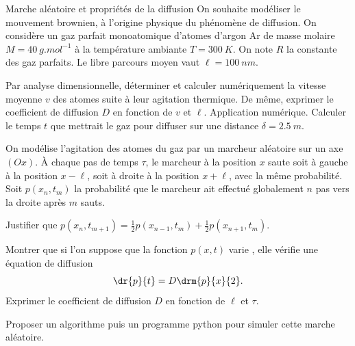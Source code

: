 \begin{exo}[PC][1][colle]{Marche aléatoire et propriétés de la diffusion}%
On souhaite modéliser le mouvement brownien, à l'origine physique du phénomène de diffusion. On considère un gaz parfait monoatomique d'atomes d'argon Ar de masse molaire $M = \SI{40}{g.mol^{-1}}$ à la température ambiante $T=\SI{300}{K}$.  On note $R$ la constante des gaz parfaits. Le libre parcours moyen vaut $\ell = \SI{100}{nm}$.
 \begin{quest}
  \item
  Par analyse dimensionnelle, déterminer et calculer numériquement la vitesse moyenne $v$ des atomes suite à leur agitation thermique. De même, exprimer le coefficient de diffusion $D$ en fonction de $v$ et $\ell$. Application numérique.
  Calculer le temps $t$ que mettrait le gaz pour diffuser sur une distance $\delta = \SI{2.5}{m}$.
\end{quest}
On modélise l'agitation des atomes du gaz par un marcheur aléatoire sur un axe $(Ox)$. À chaque pas de temps $\tau$, le marcheur à la position $x$ saute soit à gauche à la position $x-\ell$, soit à droite à la position $x+\ell$, avec la même probabilité.
Soit $p(x_n,t_m)$ la probabilité que le marcheur ait effectué globalement $n$ pas vers la droite après $m$ sauts.
  \begin{quest}
 \item Justifier que $p(x_n,t_{m+1}) = \frac{1}{2} p(x_{n-1},t_m) + \frac{1}{2} p(x_{n+1},t_m) $.
 \item
 Montrer que si l'on suppose que la fonction $p(x,t)$ varie , elle vérifie une équation de diffusion
$$
   \dr{p}{t} = D \drm{p}{x}{2}.
$$
Exprimer le coefficient de diffusion $D$ en fonction de $\ell$ et $\tau$.
\item Proposer un algorithme puis un programme python pour simuler cette marche aléatoire.
\end{quest}
\end{exo}

